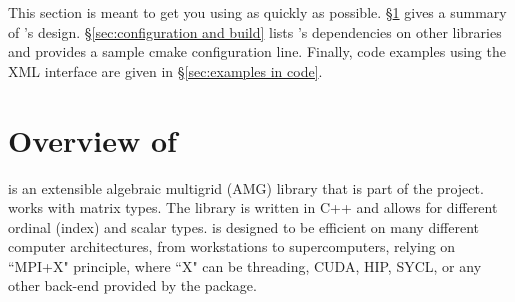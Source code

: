 This section is meant to get you using \muelu{} as quickly as possible.  \S\ref{sec:overview} gives a
summary of \muelu's design.  \S\ref{sec:configuration and build} lists \muelu's dependencies on other
\trilinos libraries and provides a sample cmake configuration line.  Finally, code examples using the XML
interface are given in \S\ref{sec:examples in code}.

\section{Overview of \muelu}
\label{sec:overview}
\muelu{} is an extensible algebraic multigrid (AMG) library that is part of the
\trilinos{} project. \muelu{} works with \tpetra matrix types. The library is
written in C++ and allows for different ordinal (index) and scalar types.
\muelu{} is designed to be efficient on many different computer architectures,
from workstations to supercomputers, relying on ``MPI+X" principle, where ``X"
can be threading, CUDA, HIP, SYCL, or any other back-end provided by the \kokkos package.

